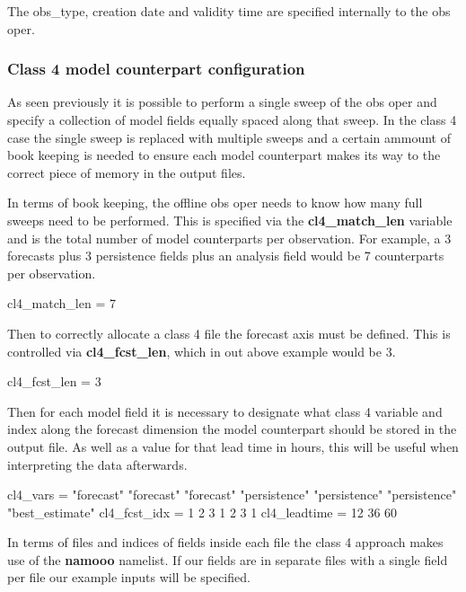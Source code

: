\documentclass[../main/NEMO_manual]{subfiles}
\begin{document}
\noindent
The obs\_type, creation date and validity time are specified internally to the obs oper.

\subsubsection{Class 4 model counterpart configuration}

As seen previously it is possible to perform a single sweep of the obs oper and
specify a collection of model fields equally spaced along that sweep.
In the class 4 case the single sweep is replaced with multiple sweeps and
a certain ammount of book keeping is needed to ensure each model counterpart makes its way to
the correct piece of memory in the output files.

\noindent
\linebreak
In terms of book keeping, the offline obs oper needs to know how many full sweeps need to be performed.
This is specified via the \textbf{cl4\_match\_len} variable and
is the total number of model counterparts per observation.
For example, a 3 forecasts plus 3 persistence fields plus an analysis field would be 7 counterparts per observation.

\begin{forlines}
   cl4_match_len = 7
\end{forlines}

Then to correctly allocate a class 4 file the forecast axis must be defined.
This is controlled via \textbf{cl4\_fcst\_len}, which in out above example would be 3.

\begin{forlines}
   cl4_fcst_len = 3
\end{forlines}

Then for each model field it is necessary to designate what class 4 variable and index along
the forecast dimension the model counterpart should be stored in the output file.
As well as a value for that lead time in hours, this will be useful when interpreting the data afterwards. 

\begin{forlines}
   cl4_vars = "forecast" "forecast" "forecast" "persistence" "persistence"
              "persistence" "best_estimate"
   cl4_fcst_idx = 1 2 3 1 2 3 1
   cl4_leadtime = 12 36 60 
\end{forlines}

In terms of files and indices of fields inside each file the class 4 approach makes use of
the \textbf{namooo} namelist.
If our fields are in separate files with a single field per file our example inputs will be specified.
\end{document}
